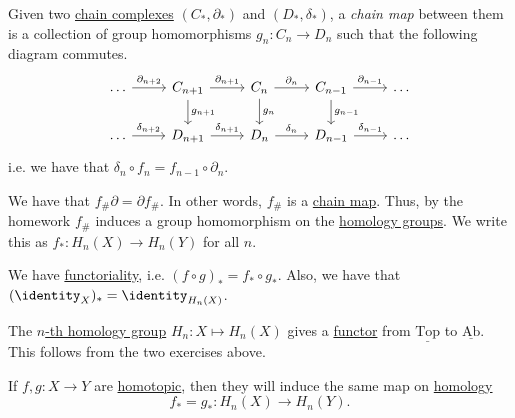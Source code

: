 \begin{definition}\label{def:chain-map}
	Given two \hyperref[def:chain-complex]{chain complexes} $(C_\ast, \partial_\ast)$ and $(D_\ast, \delta_\ast)$, a \emph{chain map} between them is a collection of
	group homomorphisms $g_n \colon C_n \to D_n$ such that the following diagram commutes.
	\[\begin{tikzcd}
			\ldots & {C_{n+1}} & {C_n} & {C_{n-1}} & \ldots \\
			\ldots & {D_{n+1}} & {D_n} & {D_{n-1}} & \ldots
			\arrow["{\partial_{n+2}}", from=1-1, to=1-2]
			\arrow["{\delta_{n+2}}", from=2-1, to=2-2]
			\arrow["{\delta_{n+1}}", from=2-2, to=2-3]
			\arrow["{\delta_{n}}", from=2-3, to=2-4]
			\arrow["{\partial_{n-1}}", from=1-4, to=1-5]
			\arrow["{\partial_{n}}", from=1-3, to=1-4]
			\arrow["{\partial_{n+1}}", from=1-2, to=1-3]
			\arrow["{\delta_{n-1}}", from=2-4, to=2-5]
			\arrow["{g_{n-1}}", from=1-4, to=2-4]
			\arrow["{g_{n}}", from=1-3, to=2-3]
			\arrow["{g_{n+1}}", from=1-2, to=2-2]
		\end{tikzcd}\]
	i.e. we have that $\delta_n \circ f_n = f_{n - 1} \circ \partial_n$.
\end{definition}

\begin{exercise}
	We have that $f_{\#} \partial = \partial f_{\#}$. In other words, $f_{\#}$ is a \hyperref[def:chain-map]{chain map}. Thus, by the homework $f_{\#}$ induces a group
	homomorphism on the \hyperref[def:homology-group]{homology groups}. We write this as $f_\ast \colon H_n(X) \to H_n(Y)$ for all $n$.
\end{exercise}

\begin{exercise}
	We have \underline{functoriality}, i.e. $(f \circ g)_\ast = f_\ast \circ g_\ast$. Also, we have that $(\identity_X)_\ast = \identity_{H_n(X)}$.
\end{exercise}

\begin{theorem}\label{thm:homology-group-defines-a-functor}
	The \hyperref[def:homology-group]{\(n\)-th homology group} $H_n \colon X \mapsto H_n(X)$ gives a \hyperref[def:functor]{functor} from $\underline{\mathrm{Top}}$
	to $\underline{\mathrm{Ab} }$. This follows from the two exercises above.
\end{theorem}

\begin{theorem}\label{thm:functoriality-is-homotopy-invariant}
	If $f, g\colon X \to Y$ are \hyperref[def:homotopic]{homotopic}, then they will induce the same map on \hyperref[def:homology-group]{homology}
	\[
		f_\ast = g_\ast : H_n(X) \to H_n(Y).
	\]
\end{theorem}


